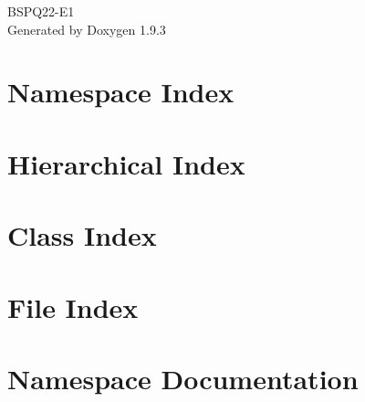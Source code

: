 \documentclass[twoside]{book}
\newcommand{\+}{\discretionary{\mbox{\scriptsize$\hookleftarrow$}}{}{}}
\newcommand{\clearemptydoublepage}{%
    \newpage{\pagestyle{empty}\cleardoublepage}%
  }
\begin{document}
  \raggedbottom
    \hypersetup{pageanchor=false,
                bookmarksnumbered=true,
                pdfencoding=unicode
               }
  \begin{titlepage}
  \vspace*{7cm}
  \begin{center}%
  {\Large BSPQ22-\/\+E1}\\
  \vspace*{1cm}
  {\large Generated by Doxygen 1.9.3}\\
  \end{center}
  \end{titlepage}
  \clearemptydoublepage
  \tableofcontents
  \clearemptydoublepage
  \hypersetup{pageanchor=true}
\chapter{Namespace Index}

\chapter{Hierarchical Index}

\chapter{Class Index}

\chapter{File Index}

\chapter{Namespace Documentation}





\end{document}
